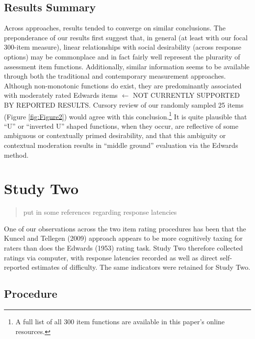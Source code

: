 \documentclass[
  ,jou]{apa6}
\begin{document}
\hypertarget{results-summary}{%
\subsection{Results Summary}\label{results-summary}}

Across approaches, results tended to converge on similar conclusions. The preponderance of our results first suggest that, in general (at least with our focal 300-item measure), linear relationships with social desirability (across response options) may be commonplace and in fact fairly well represent the plurarity of assessment item functions. Additionally, similar information seems to be available through both the traditional and contemporary measurement approaches. Although non-monotonic functions do exist, they are predominantly associated with moderately rated Edwards items \(\leftarrow\) NOT CURRENTLY SUPPORTED BY REPORTED RESULTS. Cursory review of our randomly sampled 25 items (Figure \ref{fig:Figure2}) would agree with this conclusion.\footnote{A full list of all 300 item functions are available in this paper's online resources.} It is quite plausible that ``U'' or ``inverted U'' shaped functions, when they occur, are reflective of some ambiguous or contextually primed desirability, and that this ambiguity or contextual moderation results in ``middle ground'' evaluation via the Edwards method.

\hypertarget{study-two}{%
\section{Study Two}\label{study-two}}

\begin{quote}
put in some references regarding response latencies
\end{quote}

One of our observations across the two item rating procedures has been that the Kuncel and Tellegen (2009) approach appears to be more cognitively taxing for raters than does the Edwards (1953) rating task. Study Two therefore collected ratings via computer, with response latencies recorded as well as direct self-reported estimates of difficulty. The same indicators were retained for Study Two.

\hypertarget{procedure-1}{%
\subsection{Procedure}\label{procedure-1}}
\end{document}

